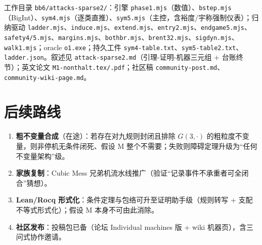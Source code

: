 \documentclass[11pt]{ctexart}
\theoremstyle{definition}
\begin{document}
工作目录 \texttt{bb6/attacks-sparse2/}：引擎 \texttt{phase1.mjs}（数值）、\texttt{bstep.mjs}（BigInt）、\texttt{sym4.mjs}（逐类直推）、\texttt{sym5.mjs}（主控，含裕度/宇称强制仪表）；归纳驱动 \texttt{ladder.mjs}、\texttt{induce.mjs}、\texttt{extend.mjs}、\texttt{entry2.mjs}、\texttt{endgame5.mjs}、\texttt{safety4/5.mjs}、\texttt{margins.mjs}、\texttt{bothbr.mjs}、\texttt{brent32.mjs}、\texttt{sigdyn.mjs}、\texttt{walk1.mjs}；oracle \texttt{o1.exe}；持久工件 \texttt{sym4-table.txt}、\texttt{sym5-table2.txt}、\texttt{ladder.json}。叙述见 \texttt{attack-sparse2.md}（引理-证明-机器三元组 + 台账终节）；英文论文 \texttt{M1-nonthalt.tex/.pdf}；社区稿 \texttt{community-post.md}、\texttt{community-wiki-page.md}。

\section{后续路线}

\begin{enumerate}
\item \textbf{粗不变量合成}（在途）：若存在对九规则封闭且排除 $G(3,\cdot)$ 的粗粒度不变量，则非停机无条件闭死、假设 M 整个不需要；失败则障碍定理升级为``任何不变量架构''级。
\item \textbf{家族复制}：Cubic Mess 兄弟机流水线推广（验证``记录事件不承重者可全闭合''猜想）。
\item \textbf{Lean/Rocq 形式化}：条件定理与包络可升至证明助手级（规则转写 + 支配不等式形式化）；假设 M 本身不可由此消除。
\item \textbf{社区发布}：投稿包已备（论坛 Individual machines 版 + wiki 机器页），含三问式协作邀请。
\end{enumerate}
\end{document}
